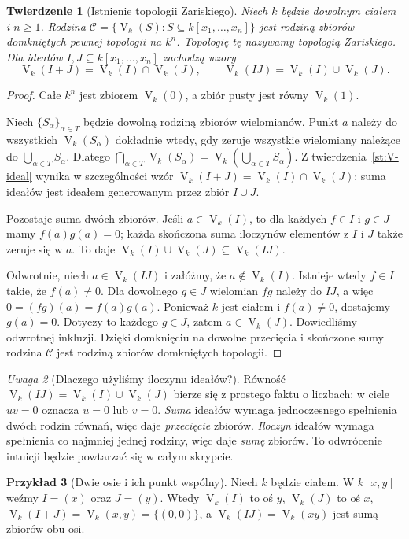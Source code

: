 \documentclass[11pt,a4paper,openany]{report}
\numberwithin{equation}{section}
\theoremstyle{plain}
\newtheorem{twierdzenie}{Twierdzenie}[section]
\theoremstyle{definition}
\newtheorem{przyklad}[twierdzenie]{Przykład}
\theoremstyle{remark}
\newtheorem{uwaga}[twierdzenie]{Uwaga}
\newcommand{\V}{\operatorname V}
\begin{document}
\begin{twierdzenie}[Istnienie topologii Zariskiego]
\label{tw:zariski-top}
Niech $k$ będzie dowolnym ciałem i $n\ge1$.
Rodzina $\mathcal C=\{\V_k(S):S\subseteq k[x_1,\dots,x_n]\}$
jest rodziną zbiorów domkniętych pewnej topologii na $k^n$.
Topologię tę nazywamy \emph{topologią Zariskiego}.
Dla ideałów $I,J\subseteq k[x_1,\dots,x_n]$ zachodzą wzory
\[
\V_k(I+J)=\V_k(I)\cap\V_k(J),\qquad
\V_k(IJ)=\V_k(I)\cup\V_k(J).
\]
\end{twierdzenie}
\begin{proof}
Całe $k^n$ jest zbiorem $\V_k(0)$, a zbiór pusty jest równy
$\V_k(1)$.

Niech $\{S_\alpha\}_{\alpha\in T}$ będzie dowolną rodziną zbiorów
wielomianów. Punkt $a$ należy do wszystkich $\V_k(S_\alpha)$
dokładnie wtedy, gdy zeruje wszystkie wielomiany należące do
$\bigcup_{\alpha\in T}S_\alpha$. Dlatego
$\bigcap_{\alpha\in T}\V_k(S_\alpha)=
\V_k(\bigcup_{\alpha\in T}S_\alpha)$.
Z twierdzenia~\ref{st:V-ideal} wynika w szczególności wzór
$\V_k(I+J)=\V_k(I)\cap\V_k(J)$: suma ideałów jest ideałem
generowanym przez zbiór $I\cup J$.

Pozostaje suma dwóch zbiorów. Jeśli $a\in\V_k(I)$, to dla
każdych $f\in I$ i $g\in J$ mamy $f(a)g(a)=0$; każda
skończona suma iloczynów elementów z $I$ i $J$ także zeruje się w $a$.
To daje $\V_k(I)\cup\V_k(J)\subseteq\V_k(IJ)$.

Odwrotnie, niech $a\in\V_k(IJ)$ i załóżmy, że
$a\notin\V_k(I)$. Istnieje wtedy $f\in I$ takie, że
$f(a)\ne0$. Dla dowolnego $g\in J$ wielomian $fg$ należy do
$IJ$, a więc $0=(fg)(a)=f(a)g(a)$. Ponieważ $k$ jest ciałem
i $f(a)\ne0$, dostajemy $g(a)=0$. Dotyczy to każdego $g\in J$,
zatem $a\in\V_k(J)$. Dowiedliśmy odwrotnej inkluzji.
Dzięki domknięciu na dowolne przecięcia i skończone sumy
rodzina $\mathcal C$ jest rodziną zbiorów domkniętych topologii.
\end{proof}

\begin{uwaga}[Dlaczego użyliśmy iloczynu ideałów?]
Równość $\V_k(IJ)=\V_k(I)\cup\V_k(J)$ bierze się z prostego
faktu o liczbach: w ciele $uv=0$ oznacza $u=0$ lub $v=0$.
\emph{Suma} ideałów wymaga jednoczesnego spełnienia dwóch rodzin
równań, więc daje \emph{przecięcie} zbiorów. \emph{Iloczyn} ideałów
wymaga spełnienia co najmniej jednej rodziny, więc daje \emph{sumę}
zbiorów. To odwrócenie intuicji będzie powtarzać się w całym skrypcie.
\end{uwaga}

\begin{przyklad}[Dwie osie i ich punkt wspólny]
Niech $k$ będzie ciałem. W $k[x,y]$ weźmy
$I=(x)$ oraz $J=(y)$.
Wtedy $\V_k(I)$ to oś $y$, $\V_k(J)$ to oś $x$,
$\V_k(I+J)=\V_k(x,y)=\{(0,0)\}$, a
$\V_k(IJ)=\V_k(xy)$ jest sumą zbiorów obu osi.
\end{przyklad}
\end{document}
